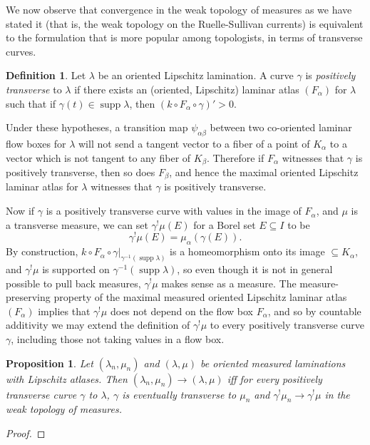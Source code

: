 \documentclass[reqno,11pt]{amsart}
\DeclareMathOperator{\supp}{supp}
\newcommand{\dfn}[1]{\emph{#1}\index{#1}}
\newtheorem{proposition}[theorem]{Proposition}
\theoremstyle{definition}
\newtheorem{definition}[theorem]{Definition}
\numberwithin{equation}{section}
\begin{document}
We now observe that convergence in the weak topology of measures as we have stated it (that is, the weak topology on the Ruelle-Sullivan currents) is equivalent to the formulation that is more popular among topologists, in terms of transverse curves.

\begin{definition}
	Let $\lambda$ be an oriented Lipschitz lamination. A curve $\gamma$ is \dfn{positively transverse} to $\lambda$ if there exists an (oriented, Lipschitz) laminar atlas $(F_\alpha)$ for $\lambda$ such that if $\gamma(t) \in \supp \lambda$, then $(k \circ F_\alpha \circ \gamma)' > 0$.
\end{definition}

Under these hypotheses, a transition map $\psi_{\alpha \beta}$ between two co-oriented laminar flow boxes for $\lambda$ will not send a tangent vector to a fiber of a point of $K_\alpha$ to a vector which is not tangent to any fiber of $K_\beta$.
Therefore if $F_\alpha$ witnesses that $\gamma$ is positively transverse, then so does $F_\beta$, and hence the maximal oriented Lipschitz laminar atlas for $\lambda$ witnesses that $\gamma$ is positively transverse.

Now if $\gamma$ is a positively transverse curve with values in the image of $F_\alpha$, and $\mu$ is a transverse measure, we can set $\gamma^! \mu(E)$ for a Borel set $E \subseteq I$ to be 
$$\gamma^! \mu(E) = \mu_\alpha(\gamma(E)).$$
By construction, $k \circ F_\alpha \circ \gamma|_{\gamma^{-1}(\supp \lambda)}$ is a homeomorphism onto its image $\subseteq K_\alpha$, and $\gamma^! \mu$ is supported on $\gamma^{-1}(\supp \lambda)$, so even though it is not in general possible to pull back measures, $\gamma^! \mu$ makes sense as a measure. 
The measure-preserving property of the maximal measured oriented Lipschitz laminar atlas $(F_\alpha)$ implies that $\gamma^! \mu$ does not depend on the flow box $F_\alpha$, and so by countable additivity we may extend the definition of $\gamma^! \mu$ to every positively transverse curve $\gamma$, including those not taking values in a flow box.

\begin{proposition}
	Let $(\lambda_n, \mu_n)$ and $(\lambda, \mu)$ be oriented measured laminations with Lipschitz atlases. Then $(\lambda_n, \mu_n) \to (\lambda, \mu)$ iff for every positively transverse curve $\gamma$ to $\lambda$, $\gamma$ is eventually transverse to $\mu_n$ and $\gamma^! \mu_n \to \gamma^! \mu$ in the weak topology of measures.
\end{proposition}
\begin{proof}
	
\end{proof}
\end{document}
